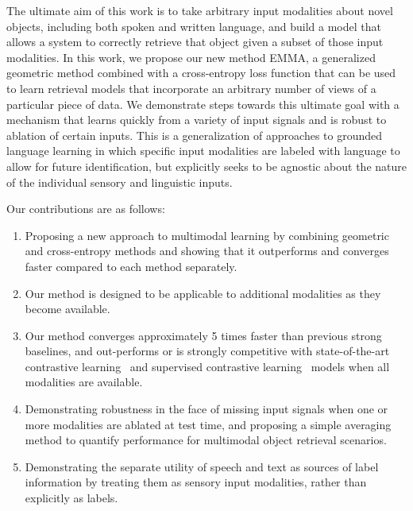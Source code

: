 \documentclass[10pt]{article} %
\newcommand{\todoff}[1]{\todo[color=blue!20]{\small #1 -- Frank}}
\newcommand{\ours}{\textsc{EMMA}}
\begin{document}
The ultimate aim of this work is to take arbitrary input modalities about novel objects, including both spoken and written language, and build a model that allows a system to correctly retrieve that object given a subset of those input modalities. In this work, we propose our new method \ours{}, a generalized geometric method combined with a cross-entropy loss function that can be used to learn retrieval models that incorporate an arbitrary number of views of a particular piece of data. We demonstrate steps towards this ultimate goal with a mechanism that learns quickly from a variety of input signals and is robust to ablation of certain inputs. This is a generalization of approaches to grounded language learning in which specific input modalities are labeled with language to allow for future identification, but explicitly seeks to be agnostic about the nature of the individual sensory and linguistic inputs. 

Our contributions are as follows:
\begin{enumerate}
    \item Proposing a new approach to multimodal learning by combining geometric and cross-entropy methods and showing that it outperforms and converges faster compared to each method separately.
    
    \item Our method is designed to be applicable to additional modalities as they become available.

    \item Our method converges approximately 5 times faster than previous strong baselines, and out-performs or is strongly competitive with state-of-the-art contrastive learning~\citep{chen2020simple} and supervised contrastive learning~\citep{NEURIPS2020_supervised_contrastive} models when all modalities are available.

    \item Demonstrating robustness in the face of missing input signals when one or more modalities are ablated at test time, and proposing a simple averaging method to quantify performance for multimodal object retrieval scenarios.
    
    \item Demonstrating the separate utility of speech and text as sources of label information by treating them as sensory input modalities, rather than explicitly as labels.
    
    
\end{enumerate}
\end{document}
